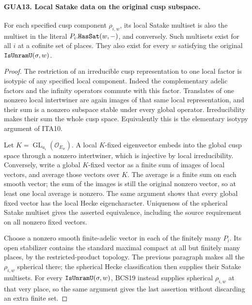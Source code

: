 \documentclass[11pt,a4paper]{article}
\numberwithin{equation}{section}
\theoremstyle{remark}\newtheorem{remark}[theorem]{Remark}
\begin{document}
\paragraph{GUA13. Local Satake data on the original cusp subspace.}
\label{claim:GUA13}
For each specified cusp component $\rho_{i,w}$, its
local Satake multiset is also the multiset in the literal
$P_i.\texttt{Has\allowbreak Sat}(w,-)$, and conversely.  Such
multisets exist for all $i$ at a cofinite set of places.
They also exist for every $w$ satisfying the original
$\texttt{Is\allowbreak Unram\allowbreak U}(\sigma,w)$.
\begin{proof}
The restriction of an irreducible cusp representation to
one local factor is isotypic of any specified local
component.  Indeed the complementary adelic factors
and the infinity operators commute with this factor.
Translates of one nonzero local intertwiner are again
images of that same local representation, and their
sum is a nonzero subspace stable under every global
operator.  Irreducibility makes their sum the whole
cusp space.  Equivalently this is the elementary
isotypy argument of ITA10.

Let $K=\operatorname{GL}_{a_i}(\mathcal O_{E_w})$.
A local $K$-fixed eigenvector embeds into the global
cusp space through a nonzero intertwiner, which is
injective by local irreducibility.  Conversely, write
a global $K$-fixed vector as a finite sum of images
of local vectors, and average those vectors over $K$.
The average is a finite sum on each smooth vector;
the sum of the images is still the original nonzero
vector, so at least one local average is nonzero.
The same argument shows that every global fixed
vector has the local Hecke eigencharacter.  Uniqueness
of the spherical Satake multiset gives the asserted
equivalence, including the source requirement on all
nonzero fixed vectors.

Choose a nonzero smooth finite-adelic vector in each
of the finitely many $P_i$.  Its open stabilizer contains
the standard maximal compact at all but finitely many
places, by the restricted-product topology.  The
previous paragraph makes all the $\rho_{i,w}$
spherical there; the spherical Hecke classification
then supplies their Satake multisets.  For every
$\texttt{Is\allowbreak Unram\allowbreak U}(\sigma,w)$, BCS19 instead supplies spherical $\rho_{i,w}$
at that very place, so the same argument gives the
last assertion without discarding an extra finite set.
\end{proof}

\end{document}
